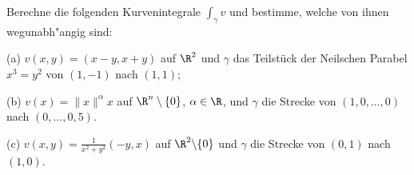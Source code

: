 \begin{prob}
Berechne die folgenden Kurvenintegrale $\int_\gamma v$ und bestimme, welche von ihnen wegunabh"angig sind:

(a) $v(x,y)=(x-y,x+y)$ auf $\R^2$ und $\gamma$ das Teilst\"uck der
Neilschen Parabel $x^3=y^2$ von $(1,-1)$ nach $(1,1)$;

(b) $v(x)=\|x\|^\alpha x$ auf $\R^n\setminus\{0\}$, $\alpha\in\R$, und $\gamma$ die Strecke von $(1,0,\dots,0)$ nach $(0,\dots,0,5)$.

(c) $v(x,y)=\frac{1}{x^2+y^2}(-y,x)$ auf $\R^2\backslash\{0\}$ und $\gamma$ die Strecke von $(0,1)$ nach $(1,0)$.
\end{prob}

